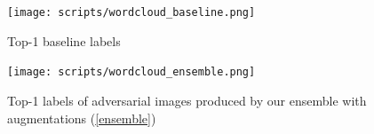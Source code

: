 \begin{figure}
    \centering
    \texttt{[image: scripts/wordcloud\_baseline.png]}
    \caption{Top-1 baseline labels}
    \label{fig:wordcloud_baseline}
\end{figure}

\begin{figure}
    \centering
    \texttt{[image: scripts/wordcloud\_ensemble.png]}
    \caption{Top-1 labels of adversarial images produced by our ensemble with augmentations (\ref{ensemble})}
    \label{fig:wordcloud_ensemble}
\end{figure}